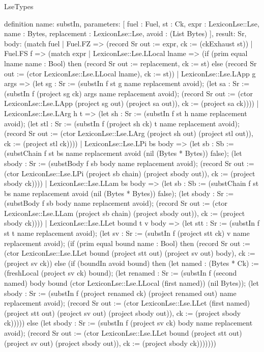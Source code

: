 \begin{lexlean}{LseTypes}
\begin{semanticmodule}
definition{
  name: substIn,
  parameters: [
    fuel : Fuel,
    st : Ck,
    expr : LexiconLse::Lse,
    name : Bytes,
    replacement : LexiconLse::Lse,
    avoid : (List Bytes)
  ],
  result: Sr,
  body: (match fuel
    | Fuel.FZ => (record Sr {out := expr, ck := (ckExhaust st)})
    | Fuel.FS f => (match expr
      | LexiconLse::Lse.LLocal lname => (if (prim equal lname name : Bool) then (record Sr {out := replacement, ck := st}) else (record Sr {out := (ctor LexiconLse::Lse.LLocal lname), ck := st}))
      | LexiconLse::Lse.LApp g args => (let sg : Sr := (substIn f st g name replacement avoid); (let sa : Sr := (substIn f (project sg ck) args name replacement avoid); (record Sr {out := (ctor LexiconLse::Lse.LApp (project sg out) (project sa out)), ck := (project sa ck)})))
      | LexiconLse::Lse.LArg h t => (let sh : Sr := (substIn f st h name replacement avoid); (let stl : Sr := (substIn f (project sh ck) t name replacement avoid); (record Sr {out := (ctor LexiconLse::Lse.LArg (project sh out) (project stl out)), ck := (project stl ck)})))
      | LexiconLse::Lse.LPi bs body => (let sb : Sb := (substChain f st bs name replacement avoid (nil (Bytes * Bytes)) false); (let sbody : Sr := (substBody f sb body name replacement avoid); (record Sr {out := (ctor LexiconLse::Lse.LPi (project sb chain) (project sbody out)), ck := (project sbody ck)})))
      | LexiconLse::Lse.LLam bs body => (let sb : Sb := (substChain f st bs name replacement avoid (nil (Bytes * Bytes)) false); (let sbody : Sr := (substBody f sb body name replacement avoid); (record Sr {out := (ctor LexiconLse::Lse.LLam (project sb chain) (project sbody out)), ck := (project sbody ck)})))
      | LexiconLse::Lse.LLet bound t v body => (let stt : Sr := (substIn f st t name replacement avoid); (let sv : Sr := (substIn f (project stt ck) v name replacement avoid); (if (prim equal bound name : Bool) then (record Sr {out := (ctor LexiconLse::Lse.LLet bound (project stt out) (project sv out) body), ck := (project sv ck)}) else (if (boundIn avoid bound) then (let named : (Bytes * Ck) := (freshLocal (project sv ck) bound); (let renamed : Sr := (substIn f (second named) body bound (ctor LexiconLse::Lse.LLocal (first named)) (nil Bytes)); (let sbody : Sr := (substIn f (project renamed ck) (project renamed out) name replacement avoid); (record Sr {out := (ctor LexiconLse::Lse.LLet (first named) (project stt out) (project sv out) (project sbody out)), ck := (project sbody ck)})))) else (let sbody : Sr := (substIn f (project sv ck) body name replacement avoid); (record Sr {out := (ctor LexiconLse::Lse.LLet bound (project stt out) (project sv out) (project sbody out)), ck := (project sbody ck)}))))))
}
\end{semanticmodule}
\end{lexlean}
